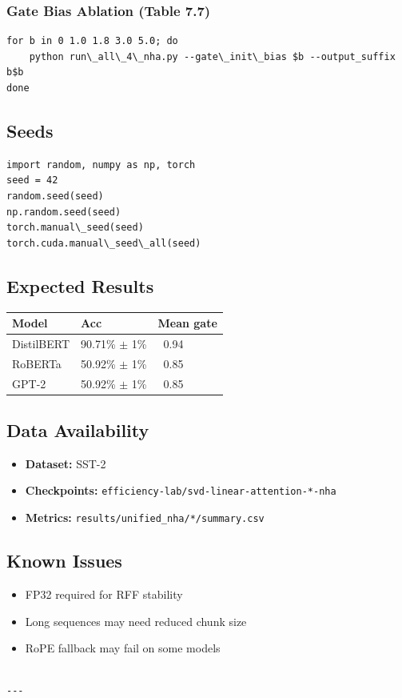 \subsubsection{Gate Bias Ablation (Table 7.7)}
\begin{lstlisting}
for b in 0 1.0 1.8 3.0 5.0; do
    python run\_all\_4\_nha.py --gate\_init\_bias $b --output_suffix b$b
done
\end{lstlisting}

\subsection{Seeds}

\begin{lstlisting}
import random, numpy as np, torch
seed = 42
random.seed(seed)
np.random.seed(seed)
torch.manual\_seed(seed)
torch.cuda.manual\_seed\_all(seed)
\end{lstlisting}

\subsection{Expected Results}

\begin{table}[H]
\centering
\small
\begin{tabular}{lll}
\toprule
\textbf{Model} & \textbf{Acc} & \textbf{Mean gate} \\
\midrule
DistilBERT & 90.71\% $\pm$ 1\% & ~0.94 \\
RoBERTa & 50.92\% $\pm$ 1\% & ~0.85 \\
GPT-2 & 50.92\% $\pm$ 1\% & ~0.85 \\
\bottomrule
\end{tabular}
\end{table}

\subsection{Data Availability}

\begin{itemize}
\item \textbf{Dataset:} SST-2
\item \textbf{Checkpoints:} \texttt{efficiency-lab/svd-linear-attention-*-nha}
\item \textbf{Metrics:} \texttt{results/unified\_nha/*/summary.csv}

\end{itemize}
\subsection{Known Issues}

\begin{itemize}
\item FP32 required for RFF stability
\item Long sequences may need reduced chunk size
\item RoPE fallback may fail on some models
\end{itemize}
\begin{lstlisting}

---
\end{lstlisting}
